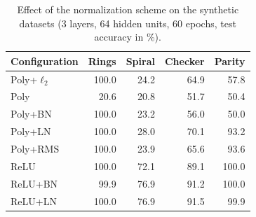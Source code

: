 \begin{table}[t]
\centering
\caption{Effect of the normalization scheme on the synthetic datasets (3 layers, 64 hidden units, 60 epochs, test accuracy in \%).}
\label{tab:synthnorm}
\small
\begin{tabular}{lrrrr}
\toprule
Configuration & Rings & Spiral & Checker & Parity \\
\midrule
Poly+$\ell_2$ & 100.0 & 24.2 & 64.9 & 57.8 \\
Poly & 20.6 & 20.8 & 51.7 & 50.4 \\
Poly+BN & 100.0 & 23.2 & 56.0 & 50.0 \\
Poly+LN & 100.0 & 28.0 & 70.1 & 93.2 \\
Poly+RMS & 100.0 & 23.9 & 65.6 & 93.6 \\
ReLU & 100.0 & 72.1 & 89.1 & 100.0 \\
ReLU+BN & 99.9 & 76.9 & 91.2 & 100.0 \\
ReLU+LN & 100.0 & 76.9 & 91.5 & 99.9 \\
\bottomrule
\end{tabular}
\end{table}
